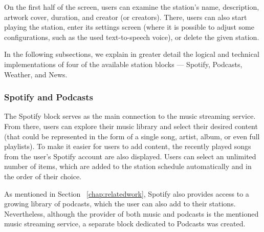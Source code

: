 On the first half of the screen, users can examine the station's name, description, artwork cover, duration, and creator (or creators). There, users can also start playing the station, enter its settings screen (where it is possible to adjust some configurations, such as the used text-to-speech voice), or delete the given station.

In the following subsections, we explain in greater detail the logical and technical implementations of four of the available station blocks — Spotify, Podcasts, Weather, and News. 


\subsubsection{Spotify and Podcasts}
\label{sub:spotify}

The Spotify block serves as the main connection to the music streaming service. From there, users can explore their music library and select their desired content (that could be represented in the form of a single song, artist, album, or even full playlists). To make it easier for users to add content, the recently played songs from the user's Spotify account are also displayed. Users can select an unlimited number of items, which are added to the station schedule automatically and in the order of their choice.

As mentioned in Section ~\ref{chap:relatedwork}, Spotify also provides access to a growing library of podcasts, which the user can also add to their stations. Nevertheless, although the provider of both music and podcasts is the mentioned music streaming service, a separate block dedicated to Podcasts was created.

